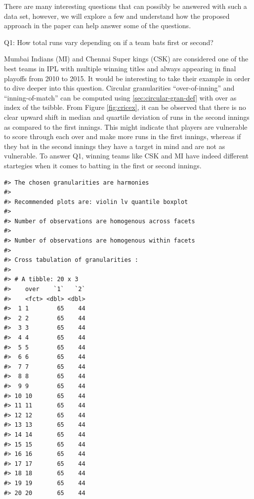 \documentclass[12pt]{article}
\begin{document}
There are many interesting questions that can possibly be answered with such a data set, however, we will explore a few and understand how the proposed approach in the paper can help answer some of the questions.

Q1: How total runs vary depending on if a team bats first or second?

Mumbai Indians (MI) and Chennai Super kings (CSK) are considered one of the best teams in IPL with multiple winning titles and always appearing in final playoffs from 2010 to 2015. It would be interesting to take their example in order to dive deeper into this question. Circular granularities ``over-of-inning'' and ``inning-of-match'' can be computed using \ref{sec:circular-gran-def} with over as index of the tsibble. From Figure \ref{fig:cricex}, it can be observed that there is no clear upward shift in median and quartile deviation of runs in the second innings as compared to the first innings. This might indicate that players are vulnerable to score through each over and make more runs in the first innings, whereas if they bat in the second innings they have a target in mind and are not as vulnerable. To answer Q1, winning teams like CSK and MI have indeed different startegies when it comes to batting in the first or second innings.

\begin{verbatim}
#> The chosen granularities are harmonies 
#>  
#> Recommended plots are: violin lv quantile boxplot 
#>  
#> Number of observations are homogenous across facets 
#>  
#> Number of observations are homogenous within facets 
#>  
#> Cross tabulation of granularities : 
#>  
#> # A tibble: 20 x 3
#>    over    `1`   `2`
#>    <fct> <dbl> <dbl>
#>  1 1        65    44
#>  2 2        65    44
#>  3 3        65    44
#>  4 4        65    44
#>  5 5        65    44
#>  6 6        65    44
#>  7 7        65    44
#>  8 8        65    44
#>  9 9        65    44
#> 10 10       65    44
#> 11 11       65    44
#> 12 12       65    44
#> 13 13       65    44
#> 14 14       65    44
#> 15 15       65    44
#> 16 16       65    44
#> 17 17       65    44
#> 18 18       65    44
#> 19 19       65    44
#> 20 20       65    44
\end{verbatim}
\end{document}
